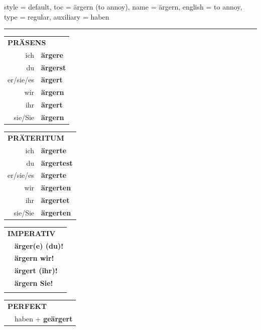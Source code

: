 \begin{verbentry}{
  style = {default},
  toc = {ärgern (to annoy)},
  name = {ärgern},
  english = {to annoy},
  type = {regular},
  auxiliary = {haben}
}
 
    
     \vspace{5pt}

    \hrule
    
    \vspace{5pt}

  \begin{tabular}{rl}
     \multicolumn{2}{l}{\textbf{PRÄSENS} }\\
    ich & \textbf{ärgere}\\
    du & \textbf{ärgerst}\\
    er/sie/es & \textbf{ärgert}\\
    wir & \textbf{ärgern}\\
    ihr & \textbf{ärgert}\\
    sie/Sie & \textbf{ärgern}\\
  \end{tabular}
  \hfill
     \begin{tabular}{rl}
    \multicolumn{2}{l}{\textbf{PRÄTERITUM} }\\
    ich & \textbf{ärgerte}\\
    du & \textbf{ärgertest}\\
    er/sie/es & \textbf{ärgerte}\\
    wir & \textbf{ärgerten}\\
    ihr & \textbf{ärgertet}\\
    sie/Sie & \textbf{ärgerten}\\
  \end{tabular}
  \hfill
  \begin{tabular}{rl}
     \multicolumn{2}{l}{\textbf{IMPERATIV} }\\
   & \textbf{ärger(e) (du)!}\\
   & \textbf{ärgern wir!}\\
   & \textbf{ärgert (ihr)!}\\
   & \textbf{ärgern Sie!}\\
   & \vspace{10pt}
  \end{tabular}

    \vspace{10pt}

 \begin{tabular}{rl}
     \multicolumn{2}{l}{\textbf{PERFEKT}}\\
   & haben + \textbf{geärgert}\\
  \end{tabular}
\hfill
   \begin{tabular}{rl}
   

\end{tabular}
\end{verbentry}
